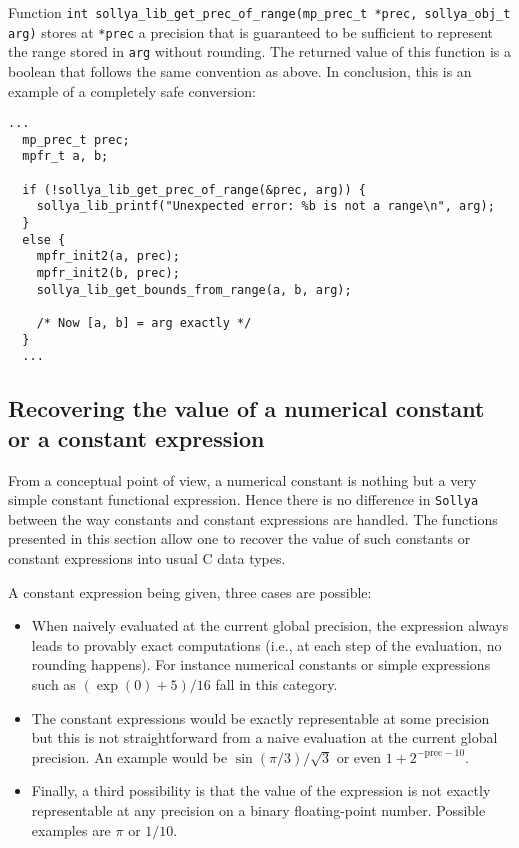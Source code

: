 \documentclass[a4paper]{article}
\newcommand{\sollya}{\texttt{Sollya}\xspace}
\begin{document}
Function  \verb|int sollya_lib_get_prec_of_range(mp_prec_t *prec, sollya_obj_t arg)| stores at \verb|*prec| a precision that is guaranteed to be sufficient to represent the range stored in \verb|arg| without rounding. The returned value of this function is a boolean that follows the same convention as above. In conclusion, this is an example of a completely safe conversion:

\begin{center}\begin{minipage}{15cm}\begin{Verbatim}[frame=single]
  ...
  mp_prec_t prec;
  mpfr_t a, b;

  if (!sollya_lib_get_prec_of_range(&prec, arg)) {
    sollya_lib_printf("Unexpected error: %b is not a range\n", arg);
  }
  else {
    mpfr_init2(a, prec);
    mpfr_init2(b, prec);
    sollya_lib_get_bounds_from_range(a, b, arg);

    /* Now [a, b] = arg exactly */
  }
  ...
\end{Verbatim}
\end{minipage}\end{center}

\subsection{Recovering the value of a numerical constant or a constant expression}
From a conceptual point of view, a numerical constant is nothing but a very simple constant functional expression. Hence there is no difference in \sollya between the way constants and constant expressions are handled. The functions presented in this section allow one to recover the value of such constants or constant expressions into usual C data types.

A constant expression being given, three cases are possible:
\begin{itemize}
\item When naively evaluated at the current global precision, the expression always leads to provably exact computations (i.e., at each step of the evaluation, no rounding happens). For instance numerical constants or simple expressions such as $(\exp(0)+5)/16$ fall in this category.
\item The constant expressions would be exactly representable at some precision but this is not straightforward from a naive evaluation at the current global precision. An example would be $\sin(\pi/3)/\sqrt{3}$ or even $1 + 2^{-\textrm{prec}-10}$.
\item Finally, a third possibility is that the value of the expression is not exactly representable at any precision on a binary floating-point number. Possible examples are $\pi$ or $1/10$.
\end{itemize}
\end{document}
